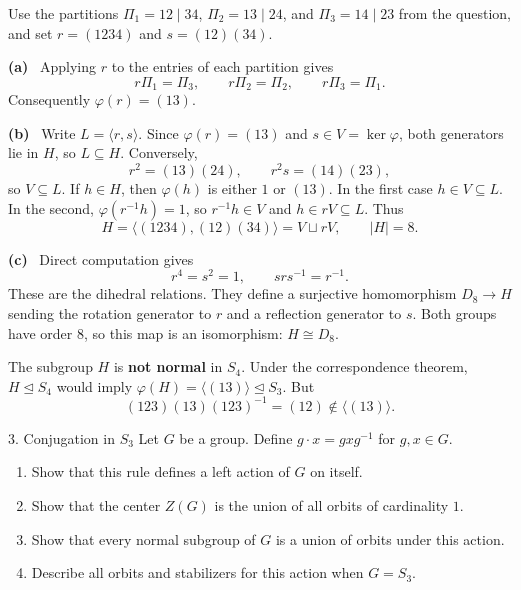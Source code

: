 \documentclass[11pt,letterpaper]{article}
\newcommand{\partlabel}[1]{\par\textbf{(#1)}\ }
\begin{document}
\begin{solution}
Use the partitions $\Pi_1=12\mid34$, $\Pi_2=13\mid24$, and $\Pi_3=14\mid23$ from the question, and set $r=(1234)$ and $s=(12)(34)$.
\partlabel{a} Applying $r$ to the entries of each partition gives
\[
 r\Pi_1=\Pi_3,\qquad r\Pi_2=\Pi_2,\qquad r\Pi_3=\Pi_1.
\]
Consequently $\boxed{\varphi(r)=(13)}$.
\partlabel{b} Write $L=\langle r,s\rangle$. Since $\varphi(r)=(13)$ and $s\in V=\ker\varphi$, both generators lie in $H$, so $L\subseteq H$. Conversely,
\[
 r^2=(13)(24),\qquad r^2s=(14)(23),
\]
so $V\subseteq L$. If $h\in H$, then $\varphi(h)$ is either $1$ or $(13)$. In the first case $h\in V\subseteq L$. In the second, $\varphi(r^{-1}h)=1$, so $r^{-1}h\in V$ and $h\in rV\subseteq L$. Thus
\[
 H=\langle(1234),(12)(34)\rangle=V\sqcup rV,\qquad \boxed{|H|=8}.
\]
\partlabel{c} Direct computation gives
\[
 r^4=s^2=1,\qquad srs^{-1}=r^{-1}.
\]
These are the dihedral relations. They define a surjective homomorphism $D_8\to H$ sending the rotation generator to $r$ and a reflection generator to $s$. Both groups have order $8$, so this map is an isomorphism: $\boxed{H\cong D_8}$.

The subgroup $H$ is \textbf{not normal} in $S_4$. Under the correspondence theorem, $H\trianglelefteq S_4$ would imply $\varphi(H)=\langle(13)\rangle\trianglelefteq S_3$. But
\[
 (123)(13)(123)^{-1}=(12)\notin\langle(13)\rangle.
\]
\end{solution}
\newpage
\begin{questionblock}{3. Conjugation in $S_3$}
Let $G$ be a group. Define $g\cdot x=gxg^{-1}$ for $g,x\in G$.
\begin{enumerate}[label=(\alph*)]
\item Show that this rule defines a left action of $G$ on itself.
\item Show that the center $Z(G)$ is the union of all orbits of cardinality $1$.
\item Show that every normal subgroup of $G$ is a union of orbits under this action.
\item Describe all orbits and stabilizers for this action when $G=S_3$.
\end{enumerate}
\end{questionblock}
\end{document}
